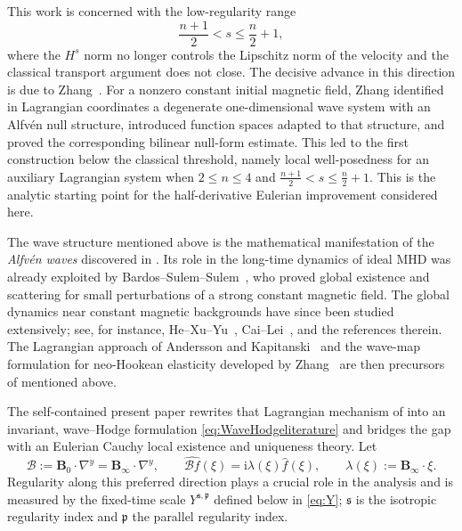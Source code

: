 \documentclass[11pt,reqno]{amsart}
\theoremstyle{plain}
\theoremstyle{definition}
\theoremstyle{remark}
\numberwithin{equation}{section}
\newcommand{\sreg}{\mathfrak s}
\newcommand{\preg}{\mathfrak p}
\newcommand{\Bzero}{\mathbf B_0}
\newcommand{\Binf}{\mathbf B_\infty}
\begin{document}
This work is concerned with the low-regularity range
\[
 \frac{n+1}{2}<s\leq\frac n2+1,
\]
where the $H^s$ norm no longer controls the Lipschitz norm of the velocity and
the classical transport argument does not close. The decisive advance in this
direction is due to Zhang~\cite{Zhang2024}. For a nonzero constant initial
magnetic field, Zhang identified in Lagrangian coordinates a degenerate
one-dimensional wave system with an Alfv\'en null structure, introduced function spaces adapted to that structure, and proved the
corresponding bilinear null-form estimate. This led to the first construction below the classical threshold, namely local well-posedness for an auxiliary Lagrangian system when $2\leq n\leq4$ and
$\frac{n+1}{2}<s\leq\frac n2+1$. This is the
analytic starting point for the half-derivative Eulerian improvement considered here.

The wave structure mentioned above is the mathematical manifestation of the
\emph{Alfv\'en waves} discovered in \cite{Alfven1942}. Its role in the long-time dynamics of ideal MHD was already exploited by Bardos--Sulem--Sulem~\cite{BardosSulemSulem1988}, who proved global existence and scattering for small perturbations of a strong constant magnetic field. The global dynamics near constant magnetic backgrounds have since been studied extensively; see, for instance, He--Xu--Yu~\cite{HeXuYu2018}, Cai--Lei~\cite{CaiLei2018}, and the references therein. The Lagrangian
approach of Andersson and Kapitanski~\cite{AnderssonKapitanski2023} and the
wave-map formulation for neo-Hookean elasticity developed by
Zhang~\cite{Zhang2023elastic} are then precursors of \cite{Zhang2024} mentioned above.

The self-contained present paper rewrites that Lagrangian mechanism of \cite{Zhang2024} into an invariant, wave--Hodge formulation \eqref{eq:WaveHodgeliterature} and bridges the gap with an Eulerian Cauchy local existence and uniqueness theory. Let
\begin{equation}\label{eq:Bmult}
 \mathcal B:=\Bzero\cdot\nabla^{y}
            =\Binf\cdot\nabla^{y},
 \qquad
 \widehat{\mathcal B f}(\xi)
   =\mathrm i\lambda(\xi)\widehat f(\xi),
 \qquad
 \lambda(\xi):=\Binf\cdot\xi .
\end{equation}
Regularity along this preferred direction plays a crucial role in the
analysis and is measured by the fixed-time scale $Y^{\sreg,\preg}$
defined below in \eqref{eq:Y}; $\sreg$ is the isotropic regularity index and $\preg$ the parallel regularity index.
\end{document}
